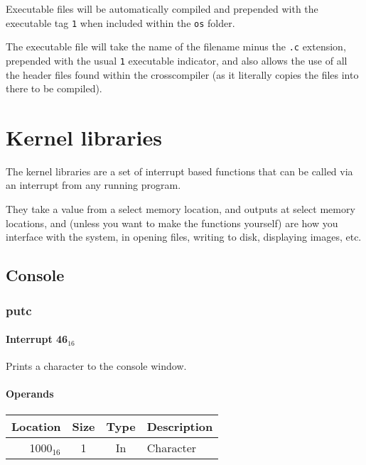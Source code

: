 \documentclass{article}
\begin{document}
Executable files will be automatically compiled and prepended with the
executable tag \verb|1| when included within the \verb|os| folder.

The executable file will take the name of the filename minus the \verb|.c|
extension, prepended with the usual \verb|1| executable indicator, and
also allows the use of all the header files found within the crosscompiler
(as it literally copies the files into there to be compiled).

\section{Kernel libraries}

The kernel libraries are a set of interrupt based functions that can be called
via an interrupt from any running program.

They take a value from a select memory location, and outputs at select memory
locations, and (unless you want to make the functions yourself) are how you
interface with the system, in opening files, writing to disk, displaying images,
etc.


\newpage

\subsection{Console}

\subsubsection{putc}

\paragraph{Interrupt 46$_{16}$}

Prints a character to the console window.

\paragraph{Operands}

\begin{tabular}{|r|c|c|l|}
	\hline
	\textbf{Location} & \textbf{Size} & \textbf{Type} & \textbf{Description} \\
	\hline
	1000$_{16}$ & 1 & In & Character \\
	\hline
\end{tabular}
\end{document}
